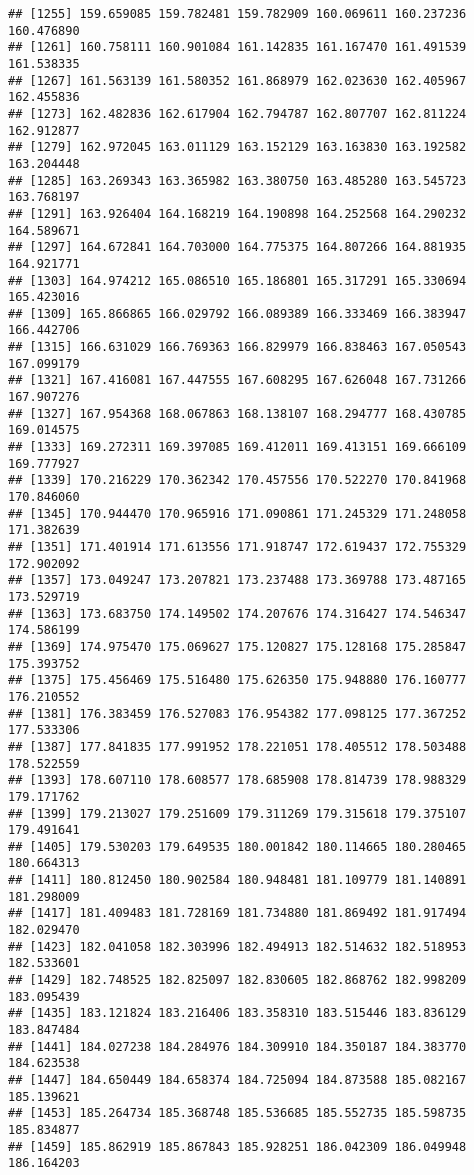 \documentclass[]{article}
\begin{document}
\begin{verbatim}
## [1255] 159.659085 159.782481 159.782909 160.069611 160.237236 160.476890
## [1261] 160.758111 160.901084 161.142835 161.167470 161.491539 161.538335
## [1267] 161.563139 161.580352 161.868979 162.023630 162.405967 162.455836
## [1273] 162.482836 162.617904 162.794787 162.807707 162.811224 162.912877
## [1279] 162.972045 163.011129 163.152129 163.163830 163.192582 163.204448
## [1285] 163.269343 163.365982 163.380750 163.485280 163.545723 163.768197
## [1291] 163.926404 164.168219 164.190898 164.252568 164.290232 164.589671
## [1297] 164.672841 164.703000 164.775375 164.807266 164.881935 164.921771
## [1303] 164.974212 165.086510 165.186801 165.317291 165.330694 165.423016
## [1309] 165.866865 166.029792 166.089389 166.333469 166.383947 166.442706
## [1315] 166.631029 166.769363 166.829979 166.838463 167.050543 167.099179
## [1321] 167.416081 167.447555 167.608295 167.626048 167.731266 167.907276
## [1327] 167.954368 168.067863 168.138107 168.294777 168.430785 169.014575
## [1333] 169.272311 169.397085 169.412011 169.413151 169.666109 169.777927
## [1339] 170.216229 170.362342 170.457556 170.522270 170.841968 170.846060
## [1345] 170.944470 170.965916 171.090861 171.245329 171.248058 171.382639
## [1351] 171.401914 171.613556 171.918747 172.619437 172.755329 172.902092
## [1357] 173.049247 173.207821 173.237488 173.369788 173.487165 173.529719
## [1363] 173.683750 174.149502 174.207676 174.316427 174.546347 174.586199
## [1369] 174.975470 175.069627 175.120827 175.128168 175.285847 175.393752
## [1375] 175.456469 175.516480 175.626350 175.948880 176.160777 176.210552
## [1381] 176.383459 176.527083 176.954382 177.098125 177.367252 177.533306
## [1387] 177.841835 177.991952 178.221051 178.405512 178.503488 178.522559
## [1393] 178.607110 178.608577 178.685908 178.814739 178.988329 179.171762
## [1399] 179.213027 179.251609 179.311269 179.315618 179.375107 179.491641
## [1405] 179.530203 179.649535 180.001842 180.114665 180.280465 180.664313
## [1411] 180.812450 180.902584 180.948481 181.109779 181.140891 181.298009
## [1417] 181.409483 181.728169 181.734880 181.869492 181.917494 182.029470
## [1423] 182.041058 182.303996 182.494913 182.514632 182.518953 182.533601
## [1429] 182.748525 182.825097 182.830605 182.868762 182.998209 183.095439
## [1435] 183.121824 183.216406 183.358310 183.515446 183.836129 183.847484
## [1441] 184.027238 184.284976 184.309910 184.350187 184.383770 184.623538
## [1447] 184.650449 184.658374 184.725094 184.873588 185.082167 185.139621
## [1453] 185.264734 185.368748 185.536685 185.552735 185.598735 185.834877
## [1459] 185.862919 185.867843 185.928251 186.042309 186.049948 186.164203

\end{verbatim}
\end{document}
